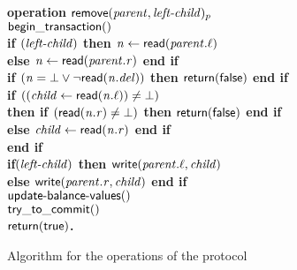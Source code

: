 \begin{figure}[h!]
{{\begin{minipage}[t]{150mm}
\begin{tabbing}
\bf{operation} $\act{remove}(\ms{parent}, \ms{left-child})_p$ \\
		 \> $\lit{begin\_transaction}()$ \\
		 \> \bf{if} $(\ms{left-child})$ \bf{then} $\ms{n} \gets \lit{read}(\ms{parent.\ell})$ \\
		 \>\> \bf{else} $\ms{n} \gets \lit{read}(\ms{parent.r})$ \bf{end if} \\
		 \> \bf{if} $(\ms{n = \bot} \vee \neg\lit{read}(\ms{n.del}))$ \bf{then} ${\sf return}(\lit{false})$ \bf{end if} \\	
		 \> \bf{if} $((\ms{child} \gets \lit{read}(\ms{n.\ell})) \neq \bot)$ \\
		 \>\> \bf{then if} $(\lit{read}(\ms{n.r}) \neq \bot)$ \bf{then} ${\sf return}(\lit{false})$ \bf{end if} \label{sline:rem-2child} \\
		 \>\> \bf{else} $\ms{child} \gets \lit{read}(\ms{n.r})$ {\bf end if} \\
		 \> \bf{end if} \\
		 \> \bf{if}$(\ms{left-child})$ \bf{then} $\lit{write}(\ms{parent.\ell}, \ms{child})$ \label{sline:rem-unlink1} \\
		 \>\> \bf{else} $\lit{write}(\ms{parent.r}, \ms{child})$ \bf{end if} \label{sline:rem-unlink2} \\
		 \> $\act{update-balance-values()}$ \label{line:u-b-v2} \\
		 \> $\lit{try\_to\_commit}()$ \\
		 \> $\sf{return}(\lit{true})$. \\
		
		

\end{tabbing}
\normalsize
\end{minipage}
}
\caption{Algorithm for the operations of the protocol}
\label{fig:ttc-protocol}
}
\end{figure}